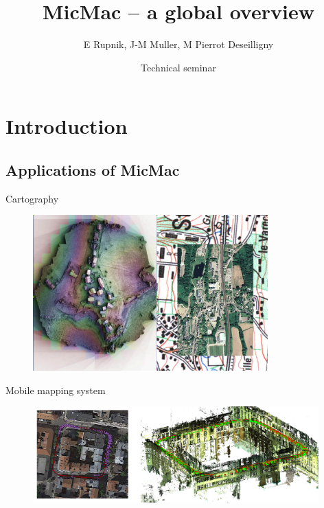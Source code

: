 \documentclass{beamer}
\title{MicMac -- a global overview}
\institute{IGN}
\date[25 May 2018]{Technical seminar}
\author[E Rupnik]{E Rupnik, J-M Muller, M Pierrot Deseilligny}
\begin{document}
    \begin{frame}[plain]
        \titlepage{}
    \end{frame}

	\tableofcontents
	

	
	
      \section{Introduction}  
      	\subsection{Applications of MicMac}
		\begin{frame}{Cartography}
		 
			\begin{figure}
			  \includegraphics[height=6cm]{../MicmacQuickMay2018/images/usage2}
			\end{figure}
		\end{frame}	
		
		\begin{frame}{Mobile mapping system}
			\begin{figure}
			  \includegraphics[width=11cm]{images/trajectory.png}
			\end{figure}
		\end{frame}	
		
\end{document}
